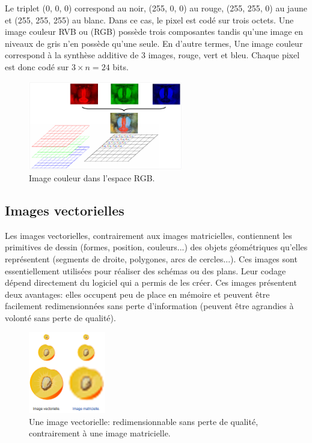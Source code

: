 Le triplet (0, 0, 0) correspond au noir, (255, 0, 0) au rouge, (255, 255, 0) au jaune et (255, 255, 255) au blanc.  Dans ce cas, le pixel est codé sur trois octets. Une image couleur RVB ou (RGB) possède trois composantes tandis qu'une image en niveaux de gris n’en possède qu’une seule. En d'autre termes, Une image couleur correspond à la synthèse additive de 3 images, rouge, vert et bleu. Chaque pixel est donc codé sur $3 \times n = 24 $ bits.

\begin{figure}[H]
	\centering
	\includegraphics[width=0.6\textwidth]{Figures/rgb} 
	\caption{Image couleur dans l’espace RGB.}
\end{figure}

\subsection{Images vectorielles}
Les images vectorielles, contrairement aux images matricielles, contiennent les primitives de dessin (formes, position, couleurs...) des objets géométriques qu’elles représentent (segments de droite, polygones, arcs de cercles...). Ces images sont essentiellement utilisées pour réaliser des schémas ou des plans. Leur codage dépend directement du logiciel qui a permis de les créer. Ces images présentent deux avantages: elles occupent peu de place en mémoire et peuvent être facilement redimensionnées sans perte d'information (peuvent être agrandies à volonté sans perte de qualité).

\begin{figure}[H]
	\centering
	\includegraphics[width=0.3\textwidth]{Figures/vecteur} 
	\caption{Une image vectorielle: redimensionnable sans perte de qualité, contrairement à une image matricielle.}
\end{figure}



